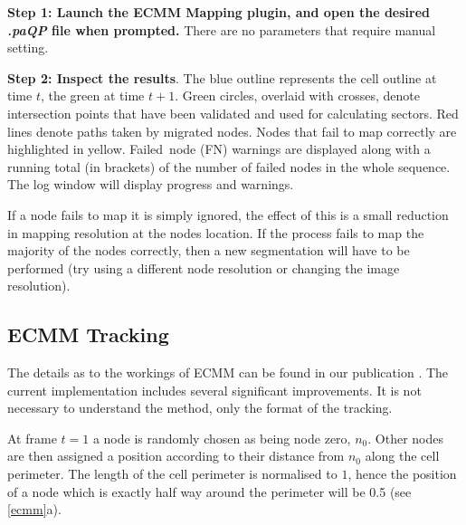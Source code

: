 \documentclass[a4paper,12pt]{article}
\begin{document}
\textbf{Step 1: Launch the ECMM Mapping plugin, and open the desired \textit{.paQP} file when prompted.}  There are no parameters that
require manual setting.

\textbf{Step 2: Inspect the results}.  The blue outline represents the cell outline at time $t$, the green at time $t+1$.  
Green circles, overlaid with crosses, denote intersection points that have been validated and used for calculating sectors.  
Red lines denote paths taken by migrated nodes.   Nodes that fail to map correctly are highlighted in yellow.
Failed~node (FN) warnings are displayed along with a running total (in brackets) of the number of failed nodes in the whole sequence.  
The log window will display progress and warnings. 

If a node fails to map it is simply ignored, the effect of this is a small reduction in mapping resolution at the nodes location.
If the process fails to map the majority of the nodes correctly, then a new segmentation will have to be performed
(try using a different node resolution or changing the image resolution).

\subsection{ECMM Tracking}
\label{ecmmTracking}

The details as to the workings of ECMM can be found in our publication \cite{Tyson2010}.
The current implementation includes several significant improvements.  It is not necessary to understand the method,
only the format of the tracking.

At frame $t=1$ a node is randomly chosen as being node zero, $n_{0}$.  Other nodes are then assigned a position
according to their distance from $n_{0}$ along the cell perimeter.  The length of the cell perimeter 
is normalised to $1$, hence the position of a node which is exactly half way around the perimeter will be 0.5
(see \autoref{ecmm}a).
\end{document}
